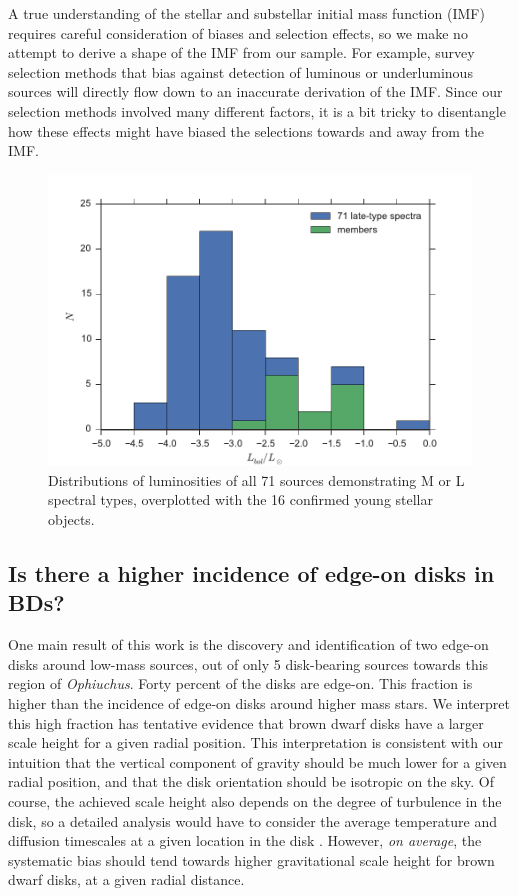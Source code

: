 A true understanding of the stellar and substellar initial mass function (IMF) requires careful consideration of biases and selection effects, so we make no attempt to derive a shape of the IMF from our sample.  For example, survey selection methods that bias against detection of luminous or underluminous sources will directly flow down to an inaccurate derivation of the IMF.  Since our selection methods involved many different factors, it is a bit tricky to disentangle how these effects might have biased the selections towards and away from the IMF.

\begin{figure}[ht!]
  \caption[Luminosity distibution of this sample and background contaminants]{Distributions of luminosities of all 71 sources demonstrating M or L spectral types, overplotted with the 16 confirmed young stellar objects. \label{fig_luminosity_dist} }
\centering
\includegraphics[scale=0.6]{chIMACS/figures/luminosity_histogram}
\end{figure}


\subsection{Is there a higher incidence of edge-on disks in BDs?}
One main result of this work is the discovery and identification of two edge-on disks around low-mass sources, out of only 5 disk-bearing sources towards this region of \emph{Ophiuchus}.  Forty percent of the disks are edge-on.  This fraction is higher than the incidence of edge-on disks around higher mass stars.  We interpret this high fraction has tentative evidence that brown dwarf disks have a larger scale height for a given radial position.  This interpretation is consistent with our intuition that the vertical component of gravity should be much lower for a given radial position, and that the disk orientation should be isotropic on the sky.  Of course, the achieved scale height also depends on the degree of turbulence in the disk, so a detailed analysis would have to consider the average temperature and diffusion timescales at a given location in the disk \citep{2012A&A...539A...9M,2009MNRAS.394L.141E}.  However, \emph{on average}, the systematic bias should tend towards higher gravitational scale height for brown dwarf disks, at a given radial distance.

